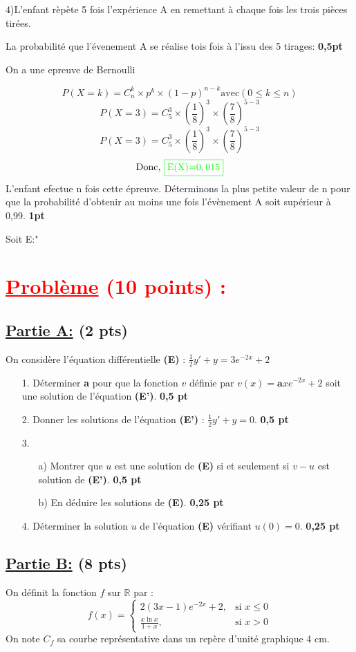 \documentclass[12pt]{article}
\begin{document}
4)L'enfant rèpète 5 fois l'expérience A en remettant à chaque fois les trois pièces tirées.

La probabilité que l'évenement A se réalise tois fois à l'issu des 5 tirages: \textbf{0,5pt}

On a une epreuve de Bernoulli

\[P(X=k)=C_{n}^{k}\times p^{k}\times (1-p)^{n-k} \text{avec} (0\leq k\leq n)\] 
\[P(X=3)=C_{5}^{3}\times \left( \frac{1}{8}\right )^{3}\times (\frac{7}{8})^{5-3}\]
\[P(X=3)=C_{5}^{3}\times \left( \frac{1}{8}\right )^{3}\times \left( \frac{7}{8} \right)^{5-3}\]
\[\text{Donc, }\color{green}{\boxed{\text{E(X)=}0,015}}\]
L'enfant efectue n fois cette épreuve. Déterminons la plus petite valeur de n pour que la probabilité d'obtenir au moins une fois l'évènement A soit supérieur à 0,99. \textbf{1pt}

Soit E:"
\section*{\textcolor{red}{\underline{Problème} (10 points) :}}
\subsection*{\underline{Partie A:} (2 pts)}
On considère l'équation différentielle \textbf{(E)} : $\frac{1}{2}y' + y = 3e^{-2x} + 2$

\begin{itemize}
    \item[1.] Déterminer \textbf{a} pour que la fonction $v$ définie par $v(x) = \textbf{a}xe^{-2x} + 2$ soit une solution de l'équation \textbf{(E')}. \textbf{0,5 pt}
    \item[2.] Donner les solutions de l'équation \textbf{(E')} : $\frac{1}{2}y' + y = 0$. \textbf{0,5 pt}
    \item[3.] 
    \begin{itemize}
        \item[a)] Montrer que $u$ est une solution de \textbf{(E)} si et seulement si $v - u$ est solution de \textbf{(E')}. \textbf{0,5 pt}
        \item[b)] En déduire les solutions de \textbf{(E)}. \textbf{0,25 pt}
    \end{itemize}
    \item[4.] Déterminer la solution $u$ de l'équation \textbf{(E)} vérifiant $u(0) = 0$. \textbf{0,25 pt}
\end{itemize}
\subsection*{\underline{Partie B:} (8 pts)}
On définit la fonction $f$ sur $\mathbb{R}$ par :
\[
f(x) = \begin{cases} 
  2(3x - 1)e^{-2x} + 2, & \text{si } x \leq 0 \\
  \frac{x\ln x}{1 + x}, & \text{si } x > 0 
\end{cases}
\]
On note $C_{f}$ sa courbe représentative dans un repère d'unité graphique 4 cm.
\end{document}
